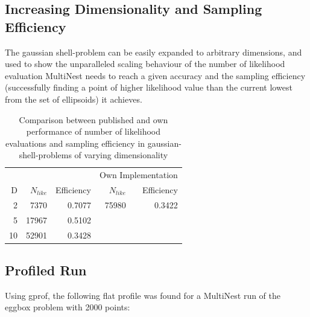 \documentclass{article}
\begin{document}
\subsection{Increasing Dimensionality and Sampling Efficiency}
The gaussian shell-problem can be easily expanded to arbitrary dimensions, and used to show the unparalleled scaling behaviour of the number of likelihood evaluation MultiNest needs to reach a given accuracy and the sampling efficiency (successfully finding a point of higher likelihood value than the current lowest from the set of ellipsoids) it achieves.
\begin{table}\label{tab:NlikeEff}
\centering
\begin{tabular}{rrrrr}
\hline
&\multicolumn{2}{c}{\cite{2009MNRAS.398.1601F}} &\multicolumn{2}{c}{Own Implementation} \\
D&$N_{like}$ & Efficiency & $N_{like}$ & Efficiency \\ \hline
 2 &  7370 & 0.7077 & 75980 & 0.3422 \\
 5 & 17967 & 0.5102 &       &        \\
10 & 52901 & 0.3428 &       &        \\ \hline
\end{tabular}
\caption{Comparison between published and own performance of number of likelihood evaluations and sampling efficiency in gaussian-shell-problems of varying dimensionality}
\end{table}

\subsection{Profiled Run}
Using gprof, the following flat profile was found for a MultiNest run of the eggbox problem with 2000 points:
\end{document}
